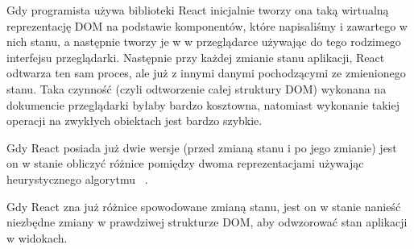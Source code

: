 \begin{description}
  Gdy programista używa biblioteki React inicjalnie tworzy ona taką wirtualną reprezentację DOM na podstawie komponentów, które napisaliśmy i zawartego w nich stanu, a następnie tworzy je w w przeglądarce używając do tego rodzimego interfejsu przeglądarki. Następnie przy każdej zmianie stanu aplikacji, React odtwarza ten sam proces, ale już z innymi danymi pochodzącymi ze zmienionego stanu. Taka czynność (czyli odtworzenie całej struktury DOM) wykonana na dokumencie przeglądarki byłaby bardzo kosztowna, natomiast wykonanie takiej operacji na zwykłych obiektach jest bardzo szybkie.

  Gdy React posiada już dwie wersje (przed zmianą stanu i po jego zmianie) jest on w stanie obliczyć różnice pomiędzy dwoma reprezentacjami używając heurystycznego algorytmu ~\cite{ref_heuristic_alg}.

  Gdy React zna już różnice spowodowane zmianą stanu, jest on w stanie nanieść niezbędne zmiany w prawdziwej strukturze DOM, aby odwzorować stan aplikacji w widokach.
\end{description}


